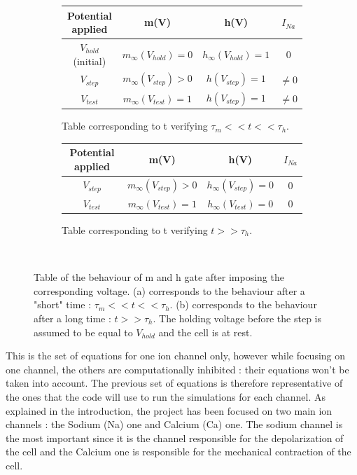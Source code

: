 \documentclass[11pt]{report}
\begin{document}
\begin{figure}[H]
    \centering
    \captionsetup{singlelinecheck = false, format= hang, justification=centerlast, font=footnotesize, labelsep=space}
    \begin{subfigure}[b]{0.5\textwidth}
        \begin{tabular}{|c|c|c|c|}
        \hline
        Potential applied & m(V) & h(V) & $I_{Na}$\\
        \hline
        $V_{hold}$ (initial) &  $m_{\infty}(V_{hold}) =0$   &  $h_{\infty}(V_{hold}) =1$ & 0 \\
        \hline
        $V_{step}$ &  $m_{\infty}(V_{step})> 0$   &  $h(V_{step}) = 1$  &  $\neq 0$  \\
        \hline
        $V_{test}$ &  $m_{\infty}(V_{test}) = 1$ &  $h(V_{step}) = 1$& $\neq 0$ \\
        \hline
        \end{tabular}
        \caption{Table corresponding to t verifying $ \tau_{m} << t << \tau_{h}$.}
    \end{subfigure}
    \begin{subfigure}[b]{0.5\textwidth}
        \begin{tabular}{|c|c|c|c|}
        \hline
        Potential applied & m(V) & h(V) & $I_{Na}$\\
        \hline
        $V_{step}$ &  $m_{\infty}(V_{step})> 0$ &   $h_{\infty}(V_{step}) = 0$ &   0  \\
        \hline
        $V_{test}$ & $m_{\infty}(V_{test})=1 $  &  $h_{\infty}(V_{test}) = 0$ & 0 \\
        \hline
        \end{tabular}
        \caption{Table corresponding to t verifying $t >> \tau_{h}$. }
    \end{subfigure}

    ~
    \caption{Table of the behaviour of m and h gate after imposing the corresponding voltage. (a) corresponds to the behaviour after a "short" time : $ \tau_{m} << t << \tau_{h}$. (b) corresponds to the behaviour after a long time : $t >> \tau_{h}$. The holding voltage before the step is assumed to be equal to $V_{hold}$ and the cell is at rest.}
    \label{tab:mandhfunctionning}
\end{figure}


This is the set of equations for one ion channel only, however while focusing on one channel, the others are computationally inhibited : their equations won't be taken into account. The previous set of equations is therefore representative of the ones that the code will use to run the simulations for each channel. As explained in the introduction, the project has been focused on two main ion channels : the Sodium (Na) one and Calcium (Ca) one. The sodium channel is the most important since it is the channel responsible for the depolarization of the cell and the Calcium one is responsible for the mechanical contraction of the cell.
\end{document}
